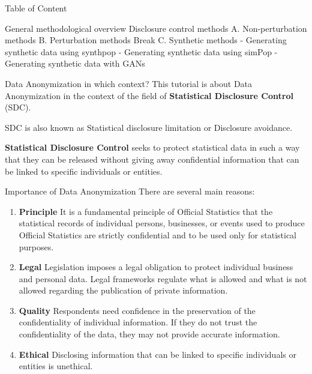 \documentclass[
  ignorenonframetext,
  aspectratio=169,
]{beamer}
\begin{document}
\begin{frame}{Table of Content}
\label{table-of-content}
\Large

General methodological overview Disclosure control methods A.
Non-perturbation methods B. Perturbation methods Break C. Synthetic
methods - Generating synthetic data using synthpop - Generating
synthetic data using simPop - Generating synthetic data with GANs
\end{frame}

\begin{frame}{Data Anonymization in which context?}
\label{data-anonymization-in-which-context}
This tutorial is about Data Anonymization in the context of the field of
\textbf{Statistical Disclosure Control} (SDC).

SDC is also known as Statistical disclosure limitation or Disclosure
avoidance.

\vspace{1cm}

\textbf{Statistical Disclosure Control} seeks to protect statistical
data in such a way that they can be released without giving away
confidential information that can be linked to specific individuals or
entities.
\end{frame}

\begin{frame}{Importance of Data Anonymization}
\label{importance-of-data-anonymization}
There are several main reasons:

\begin{enumerate}
\item
  \textbf{Principle} It is a fundamental principle of Official
  Statistics that the statistical records of individual persons,
  businesses, or events used to produce Official Statistics are strictly
  confidential and to be used only for statistical purposes.
\item
  \textbf{Legal} Legislation imposes a legal obligation to protect
  individual business and personal data. Legal frameworks regulate what
  is allowed and what is not allowed regarding the publication of
  private information.
\item
  \textbf{Quality} Respondents need confidence in the preservation of
  the confidentiality of individual information. If they do not trust
  the confidentiality of the data, they may not provide accurate
  information.
\item
  \textbf{Ethical} Disclosing information that can be linked to specific
  individuals or entities is unethical.
\end{enumerate}
\end{frame}
\end{document}
